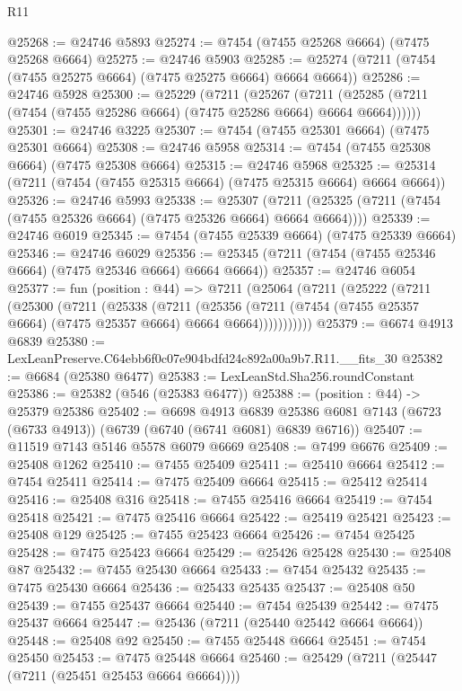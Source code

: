 \begin{lexlean}{R11}
\begin{coremodule}
@25268 := @24746 @5893
@25274 := @7454 (@7455 @25268 @6664) (@7475 @25268 @6664)
@25275 := @24746 @5903
@25285 := @25274 (@7211 (@7454 (@7455 @25275 @6664) (@7475 @25275 @6664) @6664 @6664))
@25286 := @24746 @5928
@25300 := @25229
    (@7211
      (@25267
        (@7211 (@25285 (@7211 (@7454 (@7455 @25286 @6664) (@7475 @25286 @6664) @6664 @6664))))))
@25301 := @24746 @3225
@25307 := @7454 (@7455 @25301 @6664) (@7475 @25301 @6664)
@25308 := @24746 @5958
@25314 := @7454 (@7455 @25308 @6664) (@7475 @25308 @6664)
@25315 := @24746 @5968
@25325 := @25314 (@7211 (@7454 (@7455 @25315 @6664) (@7475 @25315 @6664) @6664 @6664))
@25326 := @24746 @5993
@25338 := @25307
    (@7211 (@25325 (@7211 (@7454 (@7455 @25326 @6664) (@7475 @25326 @6664) @6664 @6664))))
@25339 := @24746 @6019
@25345 := @7454 (@7455 @25339 @6664) (@7475 @25339 @6664)
@25346 := @24746 @6029
@25356 := @25345 (@7211 (@7454 (@7455 @25346 @6664) (@7475 @25346 @6664) @6664 @6664))
@25357 := @24746 @6054
@25377 := fun (position : @44) =>
  @7211
    (@25064
      (@7211
        (@25222
          (@7211
            (@25300
              (@7211
                (@25338
                  (@7211
                    (@25356
                      (@7211 (@7454 (@7455 @25357 @6664) (@7475 @25357 @6664) @6664 @6664)))))))))))
@25379 := @6674 @4913 @6839
@25380 := LexLeanPreserve.C64ebb6f0c07e904bdfd24c892a00a9b7.R11.__fits_30
@25382 := @6684 (@25380 @6477)
@25383 := LexLeanStd.Sha256.roundConstant
@25386 := @25382 (@546 (@25383 @6477))
@25388 := (position : @44) -> @25379 @25386
@25402 := @6698
    @4913
    @6839
    @25386
    @6081
    @7143
    (@6723 (@6733 @4913))
    (@6739 (@6740 (@6741 @6081) @6839 @6716))
@25407 := @11519 @7143 @5146 @5578 @6079 @6669
@25408 := @7499 @6676
@25409 := @25408 @1262
@25410 := @7455 @25409
@25411 := @25410 @6664
@25412 := @7454 @25411
@25414 := @7475 @25409 @6664
@25415 := @25412 @25414
@25416 := @25408 @316
@25418 := @7455 @25416 @6664
@25419 := @7454 @25418
@25421 := @7475 @25416 @6664
@25422 := @25419 @25421
@25423 := @25408 @129
@25425 := @7455 @25423 @6664
@25426 := @7454 @25425
@25428 := @7475 @25423 @6664
@25429 := @25426 @25428
@25430 := @25408 @87
@25432 := @7455 @25430 @6664
@25433 := @7454 @25432
@25435 := @7475 @25430 @6664
@25436 := @25433 @25435
@25437 := @25408 @50
@25439 := @7455 @25437 @6664
@25440 := @7454 @25439
@25442 := @7475 @25437 @6664
@25447 := @25436 (@7211 (@25440 @25442 @6664 @6664))
@25448 := @25408 @92
@25450 := @7455 @25448 @6664
@25451 := @7454 @25450
@25453 := @7475 @25448 @6664
@25460 := @25429 (@7211 (@25447 (@7211 (@25451 @25453 @6664 @6664))))

\end{coremodule}
\end{lexlean}
